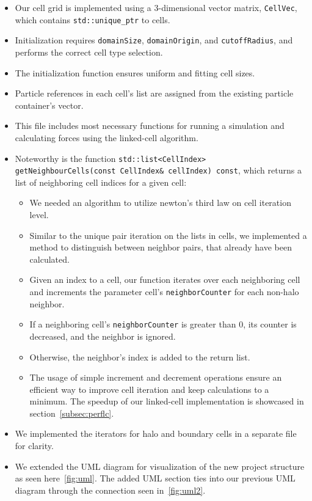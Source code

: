 \documentclass{article}
\begin{document}
\begin{itemize}
    \item Our cell grid is implemented using a 3-dimensional vector matrix, \texttt{CellVec}, which contains \texttt{std::unique\_ptr} to cells.
    \item Initialization requires \texttt{domainSize}, \texttt{domainOrigin}, and \texttt{cutoffRadius}, and performs the correct cell type selection.
    \item The initialization function ensures uniform and fitting cell sizes.
    \item Particle references in each cell's list are assigned from the existing particle container's vector.
    \item This file includes most necessary functions for running a simulation and calculating forces using the linked-cell algorithm.
    \item Noteworthy is the function \texttt{std::list<CellIndex> getNeighbourCells(const CellIndex\& cellIndex) const}, which returns a list of neighboring cell indices for a given cell:
    \begin{itemize}
        \item We needed an algorithm to utilize newton's third law on cell iteration level.
        \item Similar to the unique pair iteration on the lists in cells, we implemented a method to distinguish between neighbor pairs, that already have been calculated.
        \item Given an index to a cell, our function iterates over each neighboring cell and increments the parameter cell's \texttt{neighborCounter} for each non-halo neighbor.
        \item If a neighboring cell's \texttt{neighborCounter} is greater than 0, its counter is decreased, and the neighbor is ignored.
        \item Otherwise, the neighbor's index is added to the return list.
        \item The usage of simple increment and decrement operations ensure an efficient way to improve cell iteration and keep calculations to a minimum. The speedup of our linked-cell implementation is showcased in section\ \ref{subsec:perflc}.
    \end{itemize}
    \item We implemented the iterators for halo and boundary cells in a separate file for clarity.
    \item We extended the UML diagram for visualization of the new project structure as seen here\ \ref{fig:uml}. The added UML section ties into our previous UML diagram through the connection seen in\ \ref{fig:uml2}.
\end{itemize}
\end{document}
